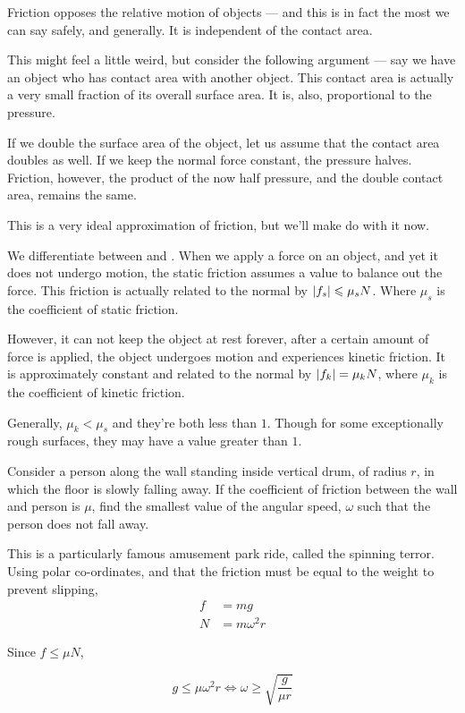 Friction opposes the relative motion of objects --- and this is in fact the most we 
can say safely, and generally. It is independent of the contact area.

This might feel a little weird, but consider the following argument --- say we have an object 
who has contact area with another object. This contact area is actually a very small fraction 
of its overall surface area. It is, also, proportional to the pressure.

If we double the surface area of the object, let us assume that the contact area doubles as well.
If we keep the normal force constant, the pressure halves. Friction, however, the 
product of the now half pressure, and the double contact area, remains the same.

This is a very ideal approximation of friction, but we'll make do with it now. 

We differentiate between  and . When we apply 
a force on an object, and yet it does not undergo motion, the static friction assumes a value 
to balance out the force. This friction is actually related to the normal by \(\abs{f_s} \leqslant \mu_sN\).
Where \(\mu_s\) is the coefficient of static friction. 

However, it can not keep the object at rest forever, after a certain amount of force is applied, 
the object undergoes motion and experiences kinetic friction. It is approximately constant 
and related to the normal by \(\abs{f_k} = \mu_kN\), where \(\mu_k\) is the coefficient of kinetic friction.

Generally, \(\mu_k < \mu_s\) and they're both less than \(1\). Though for some exceptionally rough surfaces, they
may have a value greater than \(1\).

\begin{example}

    Consider a person along the wall standing inside vertical drum, of radius \(r\), in which the floor is slowly falling 
    away. If the coefficient of friction between the wall and person is \(\mu\), find 
    the smallest value of the angular speed, \(\omega\) such that the person does not fall away.
\end{example}

    \begin{soln}
        This is a particularly famous amusement park ride, called the spinning terror. Using
        polar co-ordinates, and that the friction must be equal to the weight to prevent slipping,
        \begin{align*}
            f &= mg \\
            N &= m\omega^2r
        \end{align*}
        
        Since \(f \le \mu N\),

        \begin{equation*}
            g \le \mu \omega^2 r \iff \omega \ge \sqrt{\frac{g}{\mu r}}
        \end{equation*}
        
    \end{soln}

